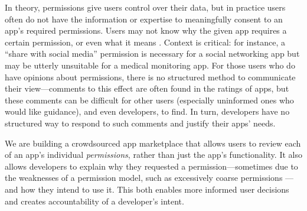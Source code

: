 \documentclass[11pt]{article}
\begin{document}
In theory, permissions give users control over their 
data, but in practice users often do not have the 
information or expertise to meaningfully consent to an 
app's required permissions. Users may not
know why the given app requires a certain permission, or
even what it means \cite{android-attention-SOUPS12}. 
Context is critical:
for instance, 
a ``share with social media'' permission is necessary for a social
networking app but may be utterly
unsuitable for a medical monitoring app. 
For those users who do have opinions about permissions, 
there is no structured method to
communicate their view---comments to this effect are often found in
the ratings of apps, but these comments can be difficult for other
users (especially uninformed ones who would like guidance), and even
developers, to find. In turn, developers have no structured way to
respond to such comments and justify their apps' needs.

We are building a crowdsourced app marketplace that allows users to review
each of an app's individual \emph{permissions}, rather than just the app's functionality. 
It also allows developers to
explain why they requested a permission---sometimes due to the
weaknesses of a permission model, such as excessively coarse permissions
\cite{permission-tracking-UBICOMM12}---and how they intend to use it. This both enables more
informed user decisions and creates accountability of a developer's intent.


\end{document}
